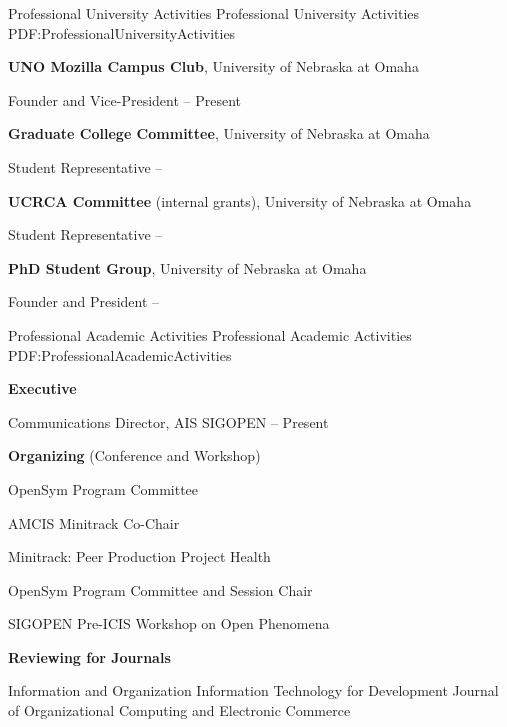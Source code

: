 \documentclass[letterpaper,MMMyyyy,nonstopmode]{simpleresumecv}
\begin{document}
\begin{Body}

\Section
{Professional University Activities}
{Professional University Activities}
{PDF:ProfessionalUniversityActivities}


\Entry
\textbf{UNO Mozilla Campus Club},
University of Nebraska at Omaha

\Gap
\BulletItem
Founder and Vice-President
\hfill
{} --
Present


\BigGap
\Entry
\textbf{Graduate College Committee},
University of Nebraska at Omaha

\Gap
\BulletItem
Student Representative
\hfill
{} --


\BigGap
\Entry
\textbf{UCRCA Committee} (internal grants),
University of Nebraska at Omaha

\Gap
\BulletItem
Student Representative
\hfill
{} --


\BigGap
\Entry
\textbf{PhD Student Group},
University of Nebraska at Omaha

\Gap
\BulletItem
Founder and President
\hfill
{} --



\Section
{Professional Academic Activities}
{Professional Academic Activities}
{PDF:ProfessionalAcademicActivities}

\Entry
\textbf{Executive}

\Gap
\BulletItem
Communications Director, AIS SIGOPEN
\hfill
{} --
Present

\BigGap
\Entry
\textbf{Organizing} (Conference and Workshop)

\BulletItem
OpenSym Program Committee
\hfill
{}

\BulletItem
AMCIS Minitrack Co-Chair
\hfill
{}
\begin{Detail}
\SubBulletItem
Minitrack: Peer Production Project Health
\end{Detail}

\BulletItem
OpenSym Program Committee and Session Chair
\hfill
{}

\BulletItem
SIGOPEN Pre-ICIS Workshop on Open Phenomena
\hfill
{}

\BigGap
\Entry
\textbf{Reviewing for Journals}
\hfill
{}
\begin{Detail}
\SubBulletItem
Information and Organization
\SubBulletItem
Information Technology for Development
\SubBulletItem
Journal of Organizational Computing and Electronic Commerce
\end{Detail}


\end{Body}
\end{document}
